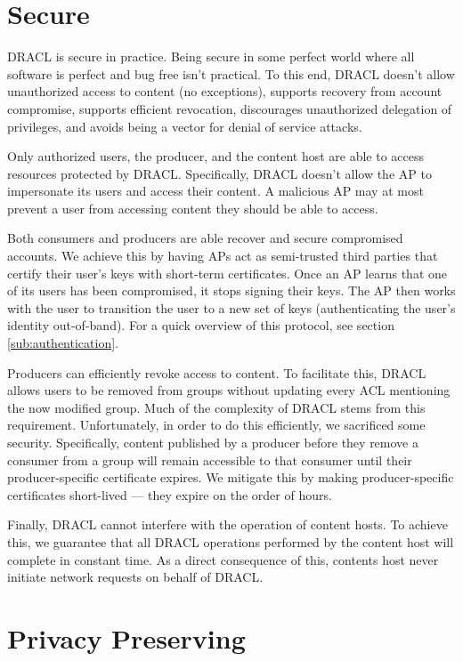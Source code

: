 \documentclass[pdftex,12pt,a4papaer,twoside,notitlepage]{report}
\begin{document}
\section{Secure}
\label{sub:secure}

DRACL is secure in practice. Being secure in some perfect world where all
software is perfect and bug free isn't practical. To this end, DRACL doesn't
allow unauthorized access to content (no exceptions), supports recovery from
account compromise, supports efficient revocation, discourages unauthorized
delegation of privileges, and avoids being a vector for denial of service
attacks.

Only authorized users, the producer, and the content host are able to
access resources protected by DRACL\@. Specifically, DRACL doesn't allow the AP
to impersonate its users and access their content. A malicious AP may at most
prevent a user from accessing content they should be able to access.

Both consumers and producers are able recover and secure compromised
accounts. We achieve this by having APs act as semi-trusted third parties that
certify their user's keys with short-term certificates. Once an AP learns that
one of its users has been compromised, it stops signing their keys. The AP then
works with the user to transition the user to a new set of keys (authenticating
the user's identity out-of-band). For a quick overview of this protocol, see
section \ref{sub:authentication}.

Producers can efficiently revoke access to content. To facilitate this, DRACL
allows users to be removed from groups without updating every ACL mentioning the
now modified group. Much of the complexity of DRACL stems from this requirement.
Unfortunately, in order to do this efficiently, we sacrificed some security.
Specifically, content published by a producer before they remove a consumer from
a group will remain accessible to that consumer until their producer-specific
certificate expires. We mitigate this by making producer-specific certificates
short-lived --- they expire on the order of hours.

Finally, DRACL cannot interfere with the operation of content hosts. To achieve
this, we guarantee that all DRACL operations performed by the content host will
complete in constant time. As a direct consequence of this, contents host never
initiate network requests on behalf of DRACL\@.

\section{Privacy Preserving}
\label{sec:privacy}
\end{document}
